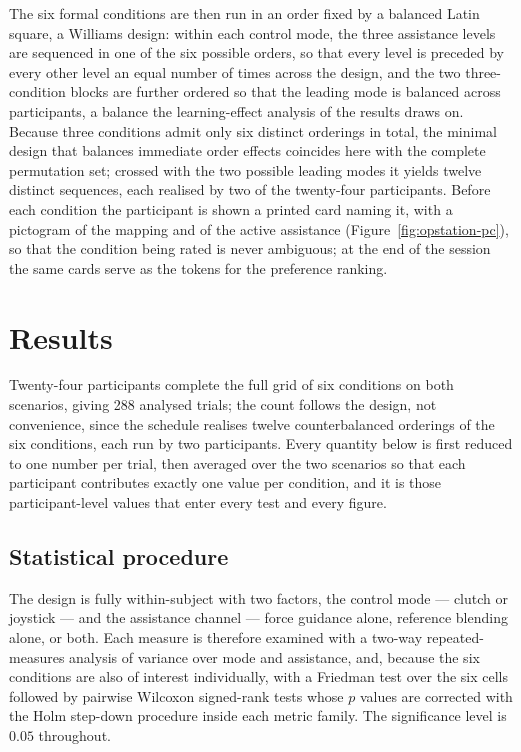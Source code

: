 The six formal conditions are then run in an order fixed by a balanced Latin square, a Williams design: within each control mode, the three assistance levels are sequenced in one of the six possible orders, so that every level is preceded by every other level an equal number of times across the design, and the two three-condition blocks are further ordered so that the leading mode is balanced across participants, a balance the learning-effect analysis of the results draws on. Because three conditions admit only six distinct orderings in total, the minimal design that balances immediate order effects coincides here with the complete permutation set; crossed with the two possible leading modes it yields twelve distinct sequences, each realised by two of the twenty-four participants. Before each condition the participant is shown a printed card naming it, with a pictogram of the mapping and of the active assistance (Figure~\ref{fig:opstation-pc}), so that the condition being rated is never ambiguous; at the end of the session the same cards serve as the tokens for the preference ranking.

\section{Results}
\label{sec:results}

Twenty-four participants complete the full grid of six conditions on both scenarios, giving 288 analysed trials; the count follows the design, not convenience, since the schedule realises twelve counterbalanced orderings of the six conditions, each run by two participants. Every quantity below is first reduced to one number per trial, then averaged over the two scenarios so that each participant contributes exactly one value per condition, and it is those participant-level values that enter every test and every figure.

\subsection{Statistical procedure}
\label{sec:stats}

The design is fully within-subject with two factors, the control mode --- clutch or joystick --- and the assistance channel --- force guidance alone, reference blending alone, or both. Each measure is therefore examined with a two-way repeated-measures analysis of variance over mode and assistance, and, because the six conditions are also of interest individually, with a Friedman test over the six cells followed by pairwise Wilcoxon signed-rank tests whose $p$ values are corrected with the Holm step-down procedure inside each metric family. The significance level is $0.05$ throughout.

